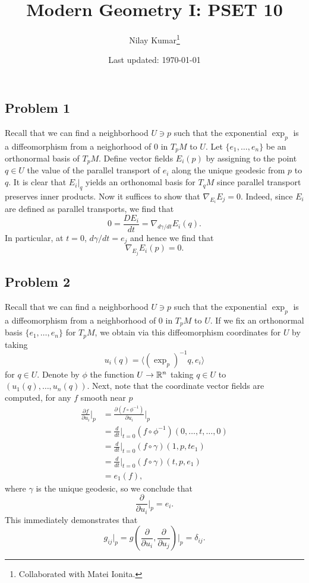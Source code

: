 \documentclass{../mathnotes}
\title{Modern Geometry I: PSET 10}
\author{Nilay Kumar\footnote{Collaborated with Matei Ionita.}}
\date{Last updated: \today}
\begin{document}
\maketitle

\subsection*{Problem 1}

Recall that we can find a neighborhood $U\ni p$ such that the exponential
$\exp_p$ is a diffeomorphism from a neighorhood of 0 in $T_pM$ to $U$.
Let $\{e_1,\ldots,e_n\}$ be an orthonormal basis of $T_pM$. Define vector
fields $E_i(p)$ by assigning to the point $q\in U$ the value of the parallel
transport of $e_i$ along the unique geodesic from $p$ to $q$. It is clear
that $E_i|_q$ yields an orthonomal basis for $T_qM$ since parallel transport
preserves inner products. Now it suffices to show that $\nabla_{E_i}E_j=0$.
Indeed, since $E_i$ are defined as parallel transports, we find that
\[0=\frac{DE_i}{dt}=\nabla_{d\gamma/dt}E_i(q).\]
In particular, at $t=0$, $d\gamma/dt=e_j$ and hence we find that
\[\nabla_{E_j}E_i(p)=0.\]

\subsection*{Problem 2}

Recall that we can find a neighborhood $U\ni p$ such that the exponential
$\exp_p$ is a diffeomorphism from a neighborhood of 0 in $T_pM$ to $U$. If
we fix an orthonormal basis $\{e_1,\ldots,e_n\}$ for $T_pM$, we obtain via
this diffeomorphism coordinates for $U$ by taking 
\[u_i(q) = \langle (\exp_p)^{-1} q, e_i\rangle\]
for $q\in U$. Denote by $\phi$ the function $U\to \mathbb{R}^n$ taking $q\in U$ to
$(u_1(q),\ldots,u_n(q))$. Next, note that the coordinate vector fields are
computed, for any $f$ smooth near $p$
\begin{align*}
    \frac{\partial f}{\partial u_i}\bigg|_p &= \frac{\partial \left(f\circ\phi^{-1}\right)}{\partial u_i}\bigg|_p\\
    &= \frac{d}{dt}\bigg|_{t=0}\left( f\circ \phi^{-1} \right)\left( 0,\ldots,t,\ldots,0 \right)\\
    &= \frac{d}{dt}\bigg|_{t=0}\left( f\circ \gamma\right)(1,p,te_1)\\
    &= \frac{d}{dt}\bigg|_{t=0}\left( f\circ \gamma \right)(t,p,e_1)\\
    &= e_1(f),
\end{align*}
where $\gamma$ is the unique geodesic, so we conclude that
\[\frac{\partial}{\partial u_i}\bigg|_{p}=e_i.\]
This immediately demonstrates that
\[g_{ij}\bigg|_p=g\left(\frac{\partial}{\partial u_i},\frac{\partial}{\partial u_j}\right)\bigg|_p=\delta_{ij}.\]
\end{document}
